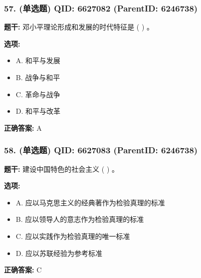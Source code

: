 \documentclass[12pt,UTF8]{ctexart}
\begin{document}
\vspace{0.3em}\hrulefill\vspace{0.7em}

\subsubsection*{57. (单选题) \small QID: 6627082 (ParentID: 6246738)}

\textbf{题干:}
邓小平理论形成和发展的时代特征是  ( )  。



\textbf{选项:}
\begin{itemize}[leftmargin=*]

  \item A. 和平与发展

  \item B. 战争与和平

  \item C. 革命与战争

  \item D. 和平与改革

\end{itemize}

\textbf{正确答案:}
A

\vspace{0.3em}\hrulefill\vspace{0.7em}

\subsubsection*{58. (单选题) \small QID: 6627083 (ParentID: 6246738)}

\textbf{题干:}
建设中国特色的社会主义  ( )  。



\textbf{选项:}
\begin{itemize}[leftmargin=*]

  \item A. 应以马克思主义的经典著作为检验真理的标准

  \item B. 应以领导人的意志作为检验真理的标准

  \item C. 应以实践作为检验真理的唯一标准

  \item D. 应以苏联经验为参考标准

\end{itemize}

\textbf{正确答案:}
C
\end{document}
